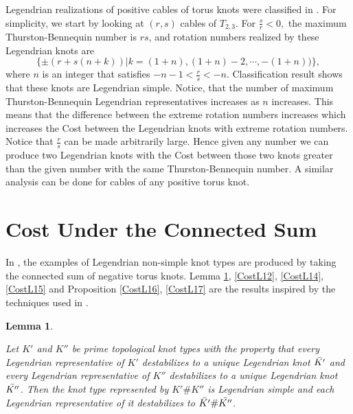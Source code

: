 \documentclass[11pt]{amsart}
\numberwithin{equation}{section}
\theoremstyle{plain}
\newtheorem{Lemma}[equation]{Lemma}
\theoremstyle{definition}
\theoremstyle{remark} \newtheorem{remark}[equation]{Remark}
\theoremstyle{remark} \newtheorem{observation}[equation]{Observation}
\begin{document}
\begin{example}
    Legendrian realizations of positive cables of torus knots were classified in \cite{ELT}. For simplicity, we start by looking at $(r,s)$ cables of $T_{2,3}$. For $\frac{s}{r}<0,$ the maximum Thurston-Bennequin number is $rs$, and rotation numbers realized by these Legendrian knots are $$\{\pm (r+s(n+k))| k=(1+n),(1+n)-2,\cdots, -(1+n))\},$$ where $n$ is an integer that satisfies $-n-1 <\frac{r}{s}<-n$. Classification result shows that these knots are Legendrian simple. Notice, that the number of maximum Thurston-Bennequin Legendrian representatives increases as $n$ increases. This means that the difference between the extreme rotation numbers increases which increases the Cost between the Legendrian knots with extreme rotation numbers. Notice that $\frac{r}{s}$ can be made arbitrarily large. Hence given any number we can produce two Legendrian knots with the Cost between those two knots greater than the given number with the same Thurston-Bennequin number. A similar analysis can be done for cables of any positive torus knot. 
    \end{example}

\section{Cost Under the Connected Sum}
In \cite{EH}, the examples of Legendrian non-simple knot types are produced by taking the connected sum of negative torus knots. Lemma \ref{CostL11}, \ref{CostL12}, \ref{CostL14}, \ref{CostL15} and Proposition \ref{CostL16}, \ref{CostL17} are the results inspired by the techniques used in \cite{EH}.

\begin{Lemma}\label{CostL11}

    Let $K'$ and $K''$ be prime topological knot types with the property that every Legendrian representative of $K'$ destabilizes to a unique Legendrian knot $\Bar{K'}$ and every Legendrian representative of $K''$ destabilizes to a unique Legendrian knot $\Bar{K''}$. Then the knot type represented by $K'\#K''$ is Legendrian simple and each Legendrian representative of it destabilizes to $\Bar{K'}\#\Bar{K''}$.
\end{Lemma}
\end{document}
